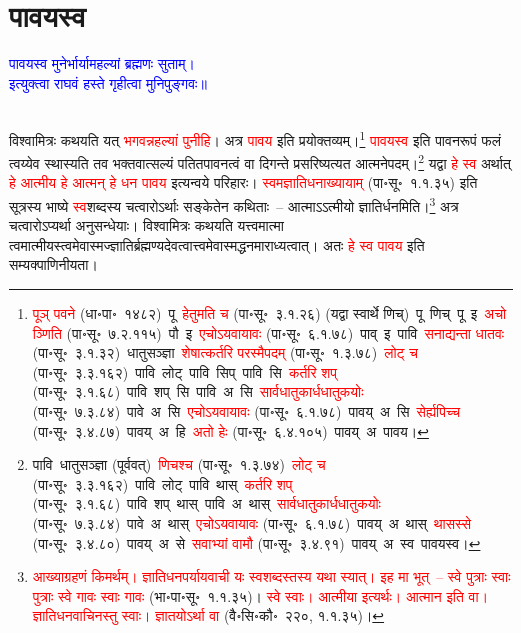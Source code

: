 \section[पावयस्व]{पावयस्व}
\centering\textcolor{blue}{पावयस्व मुनेर्भार्यामहल्यां ब्रह्मणः सुताम्।\nopagebreak\\
इत्युक्त्वा राघवं हस्ते गृहीत्वा मुनिपुङ्गवः॥}\nopagebreak\\
\\
\fontsize{14}{21}\selectfont\begin{sloppypar}\justifying\noindent\hspace{10mm} विश्वामित्रः कथयति यत्
\textcolor{red}{भगवन्नहल्यां पुनीहि}।
अत्र \textcolor{red}{पावय} इति प्रयोक्तव्यम्।\footnote{\textcolor{red}{पूञ् पवने} (धा॰पा॰~१४८२)~\arrow पू~\arrow \textcolor{red}{हेतुमति च} (पा॰सू॰~३.१.२६) (यद्वा स्वार्थे णिच्)~\arrow पू~णिच्~\arrow पू~इ~\arrow \textcolor{red}{अचो ञ्णिति} (पा॰सू॰~७.२.११५)~\arrow पौ~इ~\arrow \textcolor{red}{एचोऽयवायावः} (पा॰सू॰~६.१.७८)~\arrow पाव्~इ~\arrow पावि~\arrow \textcolor{red}{सनाद्यन्ता धातवः} (पा॰सू॰~३.१.३२)~\arrow धातु\-सञ्ज्ञा~\arrow \textcolor{red}{शेषात्कर्तरि परस्मैपदम्} (पा॰सू॰~१.३.७८)~\arrow \textcolor{red}{लोट् च} (पा॰सू॰~३.३.१६२)~\arrow पावि~लोट्~\arrow पावि~सिप्~\arrow पावि~सि~\arrow \textcolor{red}{कर्तरि शप्} (पा॰सू॰~३.१.६८)~\arrow पावि~शप्~सि~\arrow पावि~अ~सि~\arrow \textcolor{red}{सार्वधातुकार्धधातुकयोः} (पा॰सू॰~७.३.८४)~\arrow पावे~अ~सि~\arrow \textcolor{red}{एचोऽयवायावः} (पा॰सू॰~६.१.७८)~\arrow पावय्~अ~सि~\arrow \textcolor{red}{सेर्ह्यपिच्च} (पा॰सू॰~३.४.८७)~\arrow पावय्~अ~हि~\arrow \textcolor{red}{अतो हेः} (पा॰सू॰~६.४.१०५)~\arrow पावय्~अ~\arrow पावय।} \textcolor{red}{पावयस्व} इति पावन\-रूपं फलं त्वय्येव स्थास्यति तव भक्त\-वात्सल्यं पतित\-पावनत्वं वा दिगन्ते प्रसरिष्यत्यत आत्मनेपदम्।\footnote{पावि~\arrow धातु\-सञ्ज्ञा (पूर्ववत्)~\arrow \textcolor{red}{णिचश्च} (पा॰सू॰~१.३.७४)~\arrow \textcolor{red}{लोट् च} (पा॰सू॰~३.३.१६२)~\arrow पावि~लोट्~\arrow पावि~थास्~\arrow \textcolor{red}{कर्तरि शप्} (पा॰सू॰~३.१.६८)~\arrow पावि~शप्~थास्~\arrow पावि~अ~थास्~\arrow \textcolor{red}{सार्वधातुकार्धधातुकयोः} (पा॰सू॰~७.३.८४)~\arrow पावे~अ~थास्~\arrow \textcolor{red}{एचोऽयवायावः} (पा॰सू॰~६.१.७८)~\arrow पावय्~अ~थास्~\arrow \textcolor{red}{थासस्से} (पा॰सू॰~३.४.८०)~\arrow पावय्~अ~से~\arrow \textcolor{red}{सवाभ्यां वामौ} (पा॰सू॰~३.४.९१)~\arrow पावय्~अ~स्व~\arrow पावयस्व।} यद्वा \textcolor{red}{हे स्व} अर्थात् \textcolor{red}{हे आत्मीय हे आत्मन् हे धन पावय} इत्यन्वये परिहारः। \textcolor{red}{स्वमज्ञाति\-धनाख्यायाम्} (पा॰सू॰~१.१.३५) इति सूत्रस्य भाष्ये \textcolor{red}{स्व}\-शब्दस्य चत्वारोऽर्थाः सङ्केतेन कथिताः~– आत्माऽऽत्मीयो ज्ञातिर्धनमिति।\footnote{\textcolor{red}{आख्याग्रहणं किमर्थम्। ज्ञाति\-धन\-पर्यायवाची यः स्वशब्दस्तस्य यथा स्यात्। इह मा भूत्~– स्वे पुत्राः स्वाः पुत्राः स्वे गावः स्वाः गावः} (भा॰पा॰सू॰~१.१.३५)। \textcolor{red}{स्वे स्वाः। आत्मीया इत्यर्थः। आत्मान इति वा। ज्ञाति\-धन\-वाचिनस्तु स्वाः। ज्ञातयोऽर्था वा} (वै॰सि॰कौ॰~२२०, १.१.३५)।} अत्र चत्वारोऽप्यर्था अनुसन्धेयाः। विश्वामित्रः कथयति यत्त्वमात्मा त्वमात्मीयस्त्वमेवास्मज्ज्ञातिर्ब्रह्मण्य\-देवत्वात्त्वमेवास्मद्धनमाराध्यत्वात्। अतः \textcolor{red}{हे स्व पावय} इति सम्यक्पाणिनीयता।\end{sloppypar}

